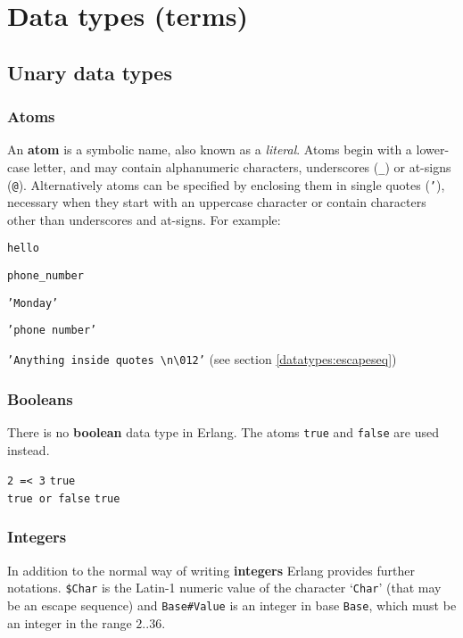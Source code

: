\chapter{Data types (terms)}
\label{datatypes}

\section{Unary data types}

\subsection{Atoms}
\label{datatypes:atom}
An \textbf{atom} is a symbolic name, also known as a
\textit{literal}.  Atoms begin with a lower-case letter, and may contain alphanumeric characters, underscores (\texttt{\_}) or at-signs (\texttt{@}).
Alternatively atoms can be specified by enclosing them in single quotes (\texttt{'}), necessary when they start with an uppercase character or contain
characters other than underscores and at-signs.  For example:

\texttt{hello}

\texttt{phone\_number}

\texttt{'Monday'}

\texttt{'phone number'}

\texttt{'Anything inside quotes \textbackslash n\textbackslash 012'}
\hfill(see section \ref{datatypes:escapeseq})


\subsection{Booleans}
\label{datatypes:boolean}
There is no \textbf{boolean} data type in Erlang. The atoms \texttt{true} and
\texttt{false} are used instead.

\texttt{2 =< 3} \resultingin \texttt{true} \\
\texttt{true or false} \resultingin \texttt{true}


\subsection{Integers}
\label{datatypes:integer}
In addition to the normal way of writing \textbf{integers} Erlang
provides further notations. \texttt{\$Char} is the Latin-1 numeric value of the
character `\texttt{Char}' (that may be an escape sequence) and \texttt{Base\#Value} is an integer in base \texttt{Base}, which
must be an integer in the range $2..36$.

